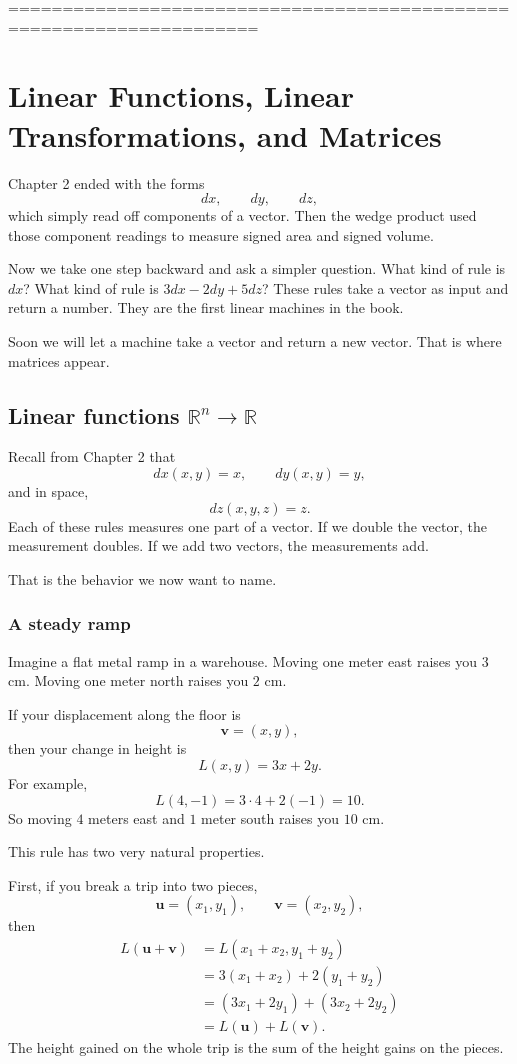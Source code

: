 =====================================================================

\chapter{Linear Functions, Linear Transformations, and Matrices}
\label{ch:3}

Chapter 2 ended with the forms
\[
    dx,\qquad dy,\qquad dz,
\]
which simply read off components of a vector.  Then the wedge product used those
component readings to measure signed area and signed volume.

Now we take one step backward and ask a simpler question.  What kind of rule is
\(dx\)?  What kind of rule is \(3dx-2dy+5dz\)?  These rules take a vector as input
and return a number.  They are the first linear machines in the book.

Soon we will let a machine take a vector and return a new vector.  That is where
matrices appear.

\section{Linear functions \(\mathbb R^n\to\mathbb R\)}

Recall from Chapter 2 that
\[
    dx(x,y)=x,\qquad dy(x,y)=y,
\]
and in space,
\[
    dz(x,y,z)=z.
\]
Each of these rules measures one part of a vector.  If we double the vector, the
measurement doubles.  If we add two vectors, the measurements add.

That is the behavior we now want to name.

\subsection{A steady ramp}

Imagine a flat metal ramp in a warehouse.  Moving one meter east raises you \(3\) cm.
Moving one meter north raises you \(2\) cm.

If your displacement along the floor is
\[
    \mathbf v=(x,y),
\]
then your change in height is
\[
    L(x,y)=3x+2y.
\]
For example,
\[
    L(4,-1)=3\cdot4+2(-1)=10.
\]
So moving \(4\) meters east and \(1\) meter south raises you \(10\) cm.

This rule has two very natural properties.

First, if you break a trip into two pieces,
\[
    \mathbf u=(x_1,y_1),
    \qquad
    \mathbf v=(x_2,y_2),
\]
then
\[
\begin{aligned}
L(\mathbf u+\mathbf v)
&=
L(x_1+x_2,y_1+y_2)\\
&=
3(x_1+x_2)+2(y_1+y_2)\\
&=
(3x_1+2y_1)+(3x_2+2y_2)\\
&=
L(\mathbf u)+L(\mathbf v).
\end{aligned}
\]
The height gained on the whole trip is the sum of the height gains on the pieces.


